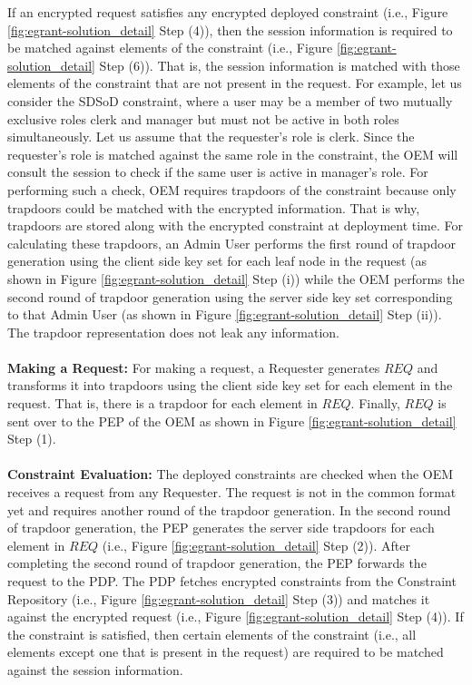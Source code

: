 \documentclass[epsfig,a4paper,11pt,titlepage]{book}
\numberwithin{algorithm}{chapter}
\begin{document}
If an encrypted request satisfies any encrypted deployed constraint (i.e., Figure \ref{fig:egrant-solution_detail} Step (4)), then the session information is required to be matched against elements of the constraint (i.e., Figure \ref{fig:egrant-solution_detail} Step (6)). That is, the session information is matched with those elements of the constraint that are not present in the request. For example, let us consider the S\gls{DSoD} constraint, where a user may be a member of two mutually exclusive roles clerk and manager but must not be active in both roles simultaneously. Let us assume that the requester's role is clerk. Since the requester's role is matched against the same role in the constraint, the \gls{OEM} will consult the session to check if the same user is active in manager's role. For performing such a check, \gls{OEM} requires trapdoors of the constraint because only trapdoors could be matched with the encrypted information. That is why, trapdoors are stored along with the encrypted constraint at deployment time. For calculating these trapdoors, an Admin User performs the first round of trapdoor generation using the client side key set for each leaf node in the request (as shown in Figure \ref{fig:egrant-solution_detail} Step (i)) while the \gls{OEM} performs the second round of trapdoor generation using the server side key set corresponding to that Admin User (as shown in Figure \ref{fig:egrant-solution_detail} Step (ii)). The trapdoor representation does not leak any information.  \\ \\
\noindent \textbf{Making a Request:} For making a request, a Requester generates $\mathit{REQ}$ and transforms it into trapdoors using the client side key set for each element in the request. That is, there is a trapdoor for each element in $\mathit{REQ}$. Finally, $\mathit{REQ}$ is sent over to the \gls{PEP} of the \gls{OEM} as shown in Figure \ref{fig:egrant-solution_detail} Step (1). \\ \\
\noindent \textbf{Constraint Evaluation:} The deployed constraints are checked when the \gls{OEM} receives a request from any Requester. The request is not in the common format yet and requires another round of the trapdoor generation. In the second round of trapdoor generation, the \gls{PEP} generates the server side trapdoors for each element in $\mathit{REQ}$ (i.e., Figure \ref{fig:egrant-solution_detail} Step (2)). After completing the second round of trapdoor generation, the \gls{PEP} forwards the request to the \gls{PDP}. The \gls{PDP} fetches encrypted constraints from the Constraint Repository (i.e., Figure \ref{fig:egrant-solution_detail} Step (3)) and matches it against the encrypted request (i.e., Figure \ref{fig:egrant-solution_detail} Step (4)). If the constraint is satisfied, then certain elements of the constraint (i.e., all elements except one that is present in the request) are required to be matched against the session information. \\ \\
\end{document}
